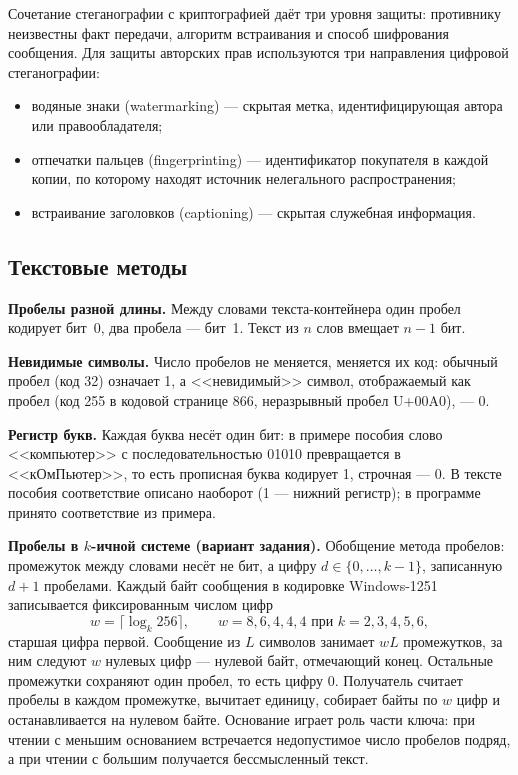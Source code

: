 \documentclass[14pt,a4paper]{extarticle}
\begin{document}
Сочетание стеганографии с криптографией даёт три уровня защиты: противнику неизвестны
факт передачи, алгоритм встраивания и способ шифрования сообщения. Для защиты авторских
прав используются три направления цифровой стеганографии:
\begin{itemize}
\item водяные знаки (watermarking) --- скрытая метка, идентифицирующая автора или
правообладателя;
\item отпечатки пальцев (fingerprinting) --- идентификатор покупателя в каждой копии,
по которому находят источник нелегального распространения;
\item встраивание заголовков (captioning) --- скрытая служебная информация.
\end{itemize}

\subsection{Текстовые методы}

\textbf{Пробелы разной длины.} Между словами текста-контейнера один пробел кодирует
бит~0, два пробела --- бит~1. Текст из $n$ слов вмещает $n - 1$ бит.

\textbf{Невидимые символы.} Число пробелов не меняется, меняется их код: обычный
пробел (код 32) означает 1, а <<невидимый>> символ, отображаемый как пробел (код 255 в
кодовой странице 866, неразрывный пробел U+00A0), --- 0.

\textbf{Регистр букв.} Каждая буква несёт один бит: в примере пособия слово
<<компьютер>> с последовательностью 01010 превращается в <<кОмПьютер>>, то есть
прописная буква кодирует 1, строчная --- 0. В тексте пособия соответствие описано
наоборот (1 --- нижний регистр); в программе принято соответствие из примера.

\textbf{Пробелы в $k$-ичной системе (вариант задания).} Обобщение метода пробелов:
промежуток между словами несёт не бит, а цифру $d \in \{0, \ldots, k - 1\}$,
записанную $d + 1$ пробелами. Каждый байт сообщения в кодировке Windows-1251
записывается фиксированным числом цифр
\begin{equation}
w = \lceil \log_k 256 \rceil, \qquad w = 8, 6, 4, 4, 4 \text{ при } k = 2, 3, 4, 5, 6,
\end{equation}
старшая цифра первой. Сообщение из $L$ символов занимает $wL$ промежутков, за ним
следуют $w$ нулевых цифр --- нулевой байт, отмечающий конец. Остальные промежутки
сохраняют один пробел, то есть цифру 0. Получатель считает пробелы в каждом
промежутке, вычитает единицу, собирает байты по $w$ цифр и останавливается на
нулевом байте. Основание играет роль части ключа: при чтении с меньшим основанием
встречается недопустимое число пробелов подряд, а при чтении с большим получается
бессмысленный текст.
\end{document}
